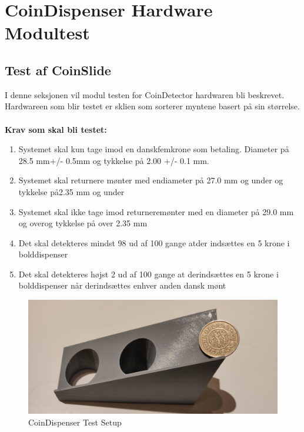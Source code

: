 \documentclass[Modultest/CoinDispenser/CoinDispenserModulTest.tex]{subfiles}
\begin{document}
\section{CoinDispenser Hardware Modultest}

\subsection{Test af CoinSlide}
I denne seksjonen vil modul testen for CoinDetector hardwaren bli beskrevet. Hardwareen som blir testet er sklien som sorterer myntene basert på sin størrelse.\\

\\

\textbf{Krav som skal bli testet:}
\begin{enumerate}
    \item Systemet skal kun tage imod en danskfemkrone som betaling. Diameter på 28.5 mm+/- 0.5mm og tykkelse på 2.00 +/- 0.1 mm.
    \item Systemet skal returnere mønter med endiameter på 27.0 mm og under og tykkelse på2.35 mm og under
    \item Systemet skal ikke tage imod returneremønter med en diameter på 29.0 mm og overog tykkelse på over 2.35 mm
    \item Det skal detekteres mindst 98 ud af 100 gange atder indsættes en 5 krone i bolddispenser
    \item Det skal detekteres højst 2 ud af 100 gange at derindsættes en 5 krone i bolddispenser når derindsættes enhver anden dansk mønt
\end{enumerate}

\begin{figure}
    \centering
    \includegraphics[width=\textwidth]{Modultest/CoinDispenser/CoinHardwareModulTest/Graphic/CoinHardwareTestSetup.jpg}
    \caption{CoinDispenser Test Setup}
    \label{fig:CoinTestSetup}
\end{figure}
\end{document}
